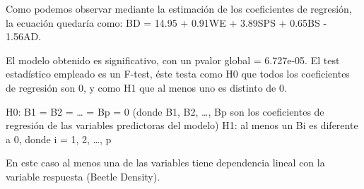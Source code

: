 \documentclass[
]{article}
\begin{document}
Como podemos observar mediante la estimación de los coeficientes de
regresión, la ecuación quedaría como: BD = 14.95 + 0.91WE + 3.89SPS +
0.65BS - 1.56AD.

El modelo obtenido es significativo, con un pvalor global = 6.727e-05.
El test estadístico empleado es un F-test, éste testa como H0 que todos
los coeficientes de regresión son 0, y como H1 que al menos uno es
distinto de 0.

H0: B1 = B2 = \ldots{} = Bp = 0 (donde B1, B2, \ldots, Bp son los
coeficientes de regresión de las variables predictoras del modelo) H1:
al menos un Bi es diferente a 0, donde i = 1, 2, \ldots, p

En este caso al menos una de las variables tiene dependencia lineal con
la variable respuesta (Beetle Density).
\end{document}
